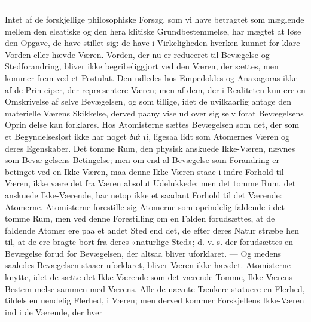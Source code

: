 \documentclass[12pt,a4paper]{book}
\newcommand{\divrule}{\begin{center}\rule{2cm}{0.4pt}\end{center}}
\newcommand{\gk}[1]{\textit{#1}}
\begin{document}
\divrule
%
%
%
%
Intet af de forskjellige philosophiske Forsøg, som vi have
betragtet som mæglende mellem den eleatiske og den hera\-%
klitiske Grundbestemmelse, har mægtet at løse den Opgave, de
have stillet sig: de have i Virkeligheden hverken kunnet for\-%
klare Vorden eller hævde Væren. Vorden, der nu er reduceret
til Bevægelse og Stedforandring, bliver ikke begribeliggjort ved
den Væren, der sættes, men kommer frem ved et Postulat.
Den udledes hos Empedokles og Anaxagoras ikke af de Prin\-%
ciper, der repræsentere Væren; men af dem, der i Realiteten
kun ere en Omskrivelse af selve Bevægelsen, og som tillige,
idet de uvilkaarlig antage den materielle Værens Skikkelse,
derved paany vise ud over sig selv forat Bevægelsens Oprin\-%
delse kan forklares. Hos Atomisterne sættes Bevægelsen som
det, der som et Begyndelsesløst ikke har noget \gk{διὰ τί}, ligesaa\-%
lidt som Atomernes Væren og deres Egenskaber. Det tomme
Rum, den physisk anskuede Ikke-Væren, nævnes som Bevæ\-%
gelsens Betingelse; men om end al Bevægelse som Forandring
er betinget ved en Ikke-Væren, maa denne Ikke-Væren staae
i indre Forhold til Væren, ikke være det fra Væren absolut
Udelukkede; men det tomme Rum, det anskuede Ikke-Værende,
har netop ikke et saadant Forhold til det Værende: Atomerne.
Atomisterne forestille sig Atomerne som oprindelig faldende i
det tomme Rum, men ved denne Forestilling om en Falden
forudsættes, at de faldende Atomer ere paa et andet Sted
end det, de efter deres Natur stræbe hen til, at de ere
bragte bort fra deres «naturlige Sted»; d. v. s. der forudsættes
en Bevægelse forud for Bevægelsen, der altsaa bliver uforklaret.
--- Og medens saaledes Bevægelsen staaer uforklaret, bliver
Væren ikke hævdet. Atomisterne knytte, idet de sætte det
Ikke-Værende som det værende Tomme, Ikke-Værens Bestem\-%
melse sammen med Værens. Alle de nævnte Tænkere statuere
en Flerhed, tildels en uendelig Flerhed, i Væren; men derved
kommer Forskjellens Ikke-Væren ind i de Værende, der hver
\end{document}
